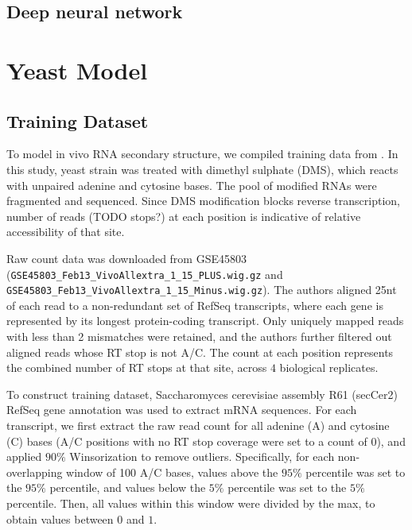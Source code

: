\documentclass{proposal}
\begin{document}
\section{Deep neural network}

%
%

\chapter{Yeast Model}

\section{Training Dataset}

To model in vivo RNA secondary structure, we compiled training data from \cite{rouskin2014genome}.
In this study, yeast strain was treated with ﻿dimethyl sulphate (DMS), which reacts with ﻿unpaired adenine and cytosine bases.
The pool of modified RNAs were fragmented and sequenced.
Since ﻿DMS modification blocks reverse transcription, ﻿
number of reads (TODO stops?) at each position is indicative of relative accessibility of that site.

Raw count data was downloaded from GSE45803 (\verb|GSE45803_Feb13_VivoAllextra_1_15_PLUS.wig.gz| and \verb|GSE45803_Feb13_VivoAllextra_1_15_Minus.wig.gz|).
The authors aligned 25nt of each read to a non-redundant set of RefSeq transcripts,
where each gene is represented by its longest protein-coding transcript.
Only uniquely mapped reads with less than 2 mismatches were retained,
and the authors further filtered out aligned reads whose RT stop is not A/C.
The count at each position represents the combined number of RT stops at that site, across $4$ biological replicates.

To construct training dataset, Saccharomyces cerevisiae assembly R61 (secCer2) RefSeq gene annotation was used to extract mRNA sequences.
For each transcript, we first extract the raw read count for all adenine (A) and cytosine (C) bases
(A/C positions with no RT stop coverage were set to a count of $0$),
and applied ﻿$90\%$ Winsorization to remove outliers.
Specifically, for each non-overlapping window of 100 A/C bases, values above the $95\%$ percentile was set to the $95\%$ percentile,
and values below the $5\%$ percentile was set to the $5\%$ percentile.
Then, all values within this window were divided by the max, to obtain values between $0$ and $1$.
\end{document}

